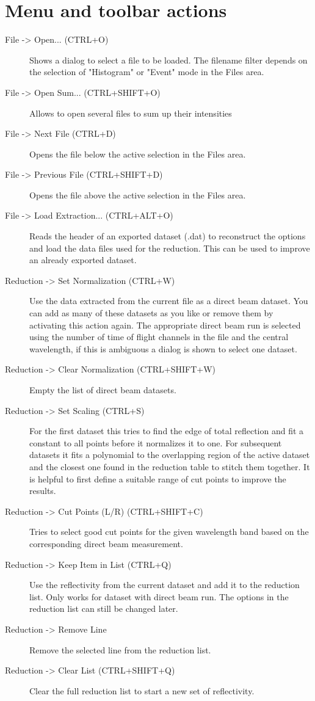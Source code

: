 \section{Menu and toolbar actions}
  
  \begin{description}
   \item[{ File -> Open... (CTRL+O)}] Shows a dialog to select a file to be loaded. The filename filter depends on the selection of "Histogram" or "Event" mode in the Files area.
   \item[File -> Open Sum... (CTRL+SHIFT+O)] Allows to open several files to sum up their intensities
   \item[{ File -> Next File (CTRL+D)}] Opens the file below the active selection in the Files area.
   \item[{ File -> Previous File (CTRL+SHIFT+D)}] Opens the file above the active selection in the Files area.
   \item[File -> Load Extraction... (CTRL+ALT+O)] Reads the header of an exported dataset (.dat) to reconstruct the options and load the data files used for the reduction. This can be used to improve an already exported dataset.
   
   \item[{ Reduction -> Set Normalization (CTRL+W)}] Use the data extracted from the current file as a direct beam dataset. You can add as many of these datasets as you like or remove them by activating this action again. The appropriate direct beam run is selected using the number of time of flight channels in the file and the central wavelength, if this is ambiguous a dialog is shown to select one dataset.
   \item[{ Reduction -> Clear Normalization (CTRL+SHIFT+W)}] Empty the list of direct beam datasets.
   
   \item[{ Reduction -> Set Scaling (CTRL+S)}] For the first dataset this tries to find the edge of total reflection and fit a constant to all points before it normalizes it to one. For subsequent datasets it fits a polynomial to the overlapping region of the active dataset and the closest one found in the reduction table to stitch them together. It is helpful to first define a suitable range of cut points to improve the results.
   \item[{ Reduction -> Cut Points (L/R) (CTRL+SHIFT+C)}] Tries to select good cut points for the given wavelength band based on the corresponding direct beam measurement.
   \item[{ Reduction -> Keep Item in List (CTRL+Q)}] Use the reflectivity from the current dataset and add it to the reduction list. Only works for dataset with direct beam run. The options in the reduction list can still be changed later.
   \item[{ Reduction -> Remove Line}] Remove the selected line from the reduction list.
   \item[{ Reduction -> Clear List (CTRL+SHIFT+Q)}] Clear the full reduction list to start a new set of reflectivity.


\end{description}
